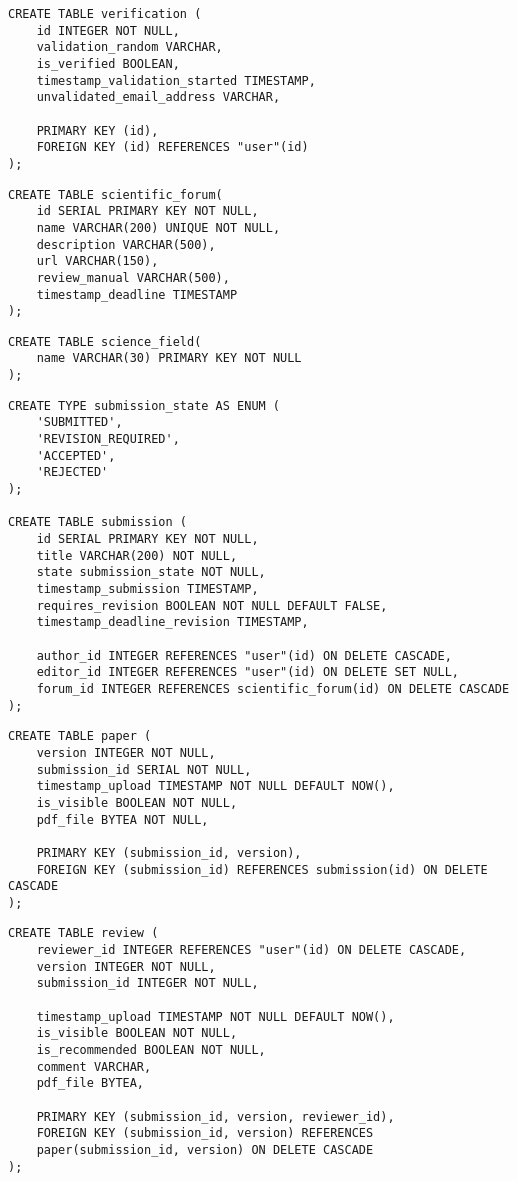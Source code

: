 \begin{lstlisting}[caption={DDL von Verifizierung}]
CREATE TABLE verification (
	id INTEGER NOT NULL,
	validation_random VARCHAR,
	is_verified BOOLEAN,
	timestamp_validation_started TIMESTAMP,
	unvalidated_email_address VARCHAR,

	PRIMARY KEY (id),
	FOREIGN KEY (id) REFERENCES "user"(id)
);
\end{lstlisting}

\begin{lstlisting}[caption={DDL von wissenschaftlichen Foren}]
CREATE TABLE scientific_forum(
	id SERIAL PRIMARY KEY NOT NULL,
	name VARCHAR(200) UNIQUE NOT NULL,
	description VARCHAR(500),
	url VARCHAR(150),
	review_manual VARCHAR(500),
	timestamp_deadline TIMESTAMP
);
\end{lstlisting}

\begin{lstlisting}[caption={DDL von Fachgebieten}]
CREATE TABLE science_field(
	name VARCHAR(30) PRIMARY KEY NOT NULL
);
\end{lstlisting}
\begin{lstlisting}[caption={DDL von Einreichungen}]
CREATE TYPE submission_state AS ENUM (
	'SUBMITTED',
	'REVISION_REQUIRED',
	'ACCEPTED',
	'REJECTED'
);

CREATE TABLE submission (
	id SERIAL PRIMARY KEY NOT NULL,
	title VARCHAR(200) NOT NULL,
	state submission_state NOT NULL,
	timestamp_submission TIMESTAMP,
	requires_revision BOOLEAN NOT NULL DEFAULT FALSE,
	timestamp_deadline_revision TIMESTAMP,

	author_id INTEGER REFERENCES "user"(id) ON DELETE CASCADE,
	editor_id INTEGER REFERENCES "user"(id) ON DELETE SET NULL,
	forum_id INTEGER REFERENCES scientific_forum(id) ON DELETE CASCADE
);
\end{lstlisting}

\begin{lstlisting}[caption={DDL von Papers}]
CREATE TABLE paper (
	version INTEGER NOT NULL,
	submission_id SERIAL NOT NULL,
	timestamp_upload TIMESTAMP NOT NULL DEFAULT NOW(),
	is_visible BOOLEAN NOT NULL,
	pdf_file BYTEA NOT NULL,

	PRIMARY KEY (submission_id, version),
	FOREIGN KEY (submission_id) REFERENCES submission(id) ON DELETE CASCADE
);
\end{lstlisting}

\begin{lstlisting}[caption={DDL von Gutachten}]
CREATE TABLE review (
	reviewer_id INTEGER REFERENCES "user"(id) ON DELETE CASCADE,
	version INTEGER NOT NULL,
	submission_id INTEGER NOT NULL,

	timestamp_upload TIMESTAMP NOT NULL DEFAULT NOW(),
	is_visible BOOLEAN NOT NULL,
	is_recommended BOOLEAN NOT NULL,
	comment VARCHAR,
	pdf_file BYTEA,

	PRIMARY KEY (submission_id, version, reviewer_id),
	FOREIGN KEY (submission_id, version) REFERENCES
	paper(submission_id, version) ON DELETE CASCADE
);
\end{lstlisting}

